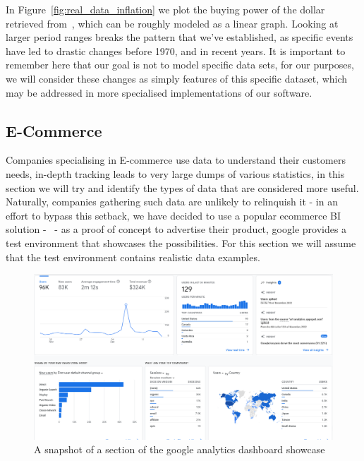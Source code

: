 In Figure~\ref{fig:real_data_inflation} we plot the buying power of the dollar retrieved
from~\cite{officialdataCPIInflationUS}, which can be roughly modeled as a linear graph.
Looking at larger period ranges breaks the pattern that we've established, as specific events have led to drastic
changes before 1970, and in recent years.
It is important to remember here that our goal is not to model specific data sets, for our purposes, we will consider
these changes as simply features of this specific dataset, which may be addressed in more specialised implementations of
our software.

\subsection{E-Commerce}

Companies specialising in E-commerce use data to understand their customers needs, in-depth tracking leads to very large
dumps of various statistics, in this section we will try and identify the types of data that are considered more useful.
Naturally, companies gathering such data are unlikely to relinquish it - in an effort to bypass this setback, we have
decided to use a popular ecommerce BI solution -~\cite{GoogleAnalytics} - as a proof of concept to advertise their
product, google provides a test environment that showcases the possibilities.
For this section we will assume that the test environment contains realistic data examples.

\begin{figure}[H]
    \centering
    \includegraphics[width=12cm]{figures/real_data_examples/google_analytics_dashboard}
    \caption{A snapshot of a section of the google analytics dashboard showcase}
    \label{fig:google_analytics_dashboard}
\end{figure}

